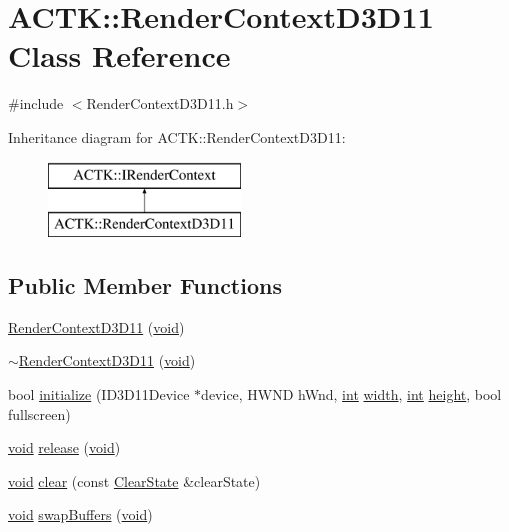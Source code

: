 \hypertarget{class_a_c_t_k_1_1_render_context_d3_d11}{\section{A\-C\-T\-K\-:\-:Render\-Context\-D3\-D11 Class Reference}
\label{class_a_c_t_k_1_1_render_context_d3_d11}
}


{\ttfamily \#include $<$Render\-Context\-D3\-D11.\-h$>$}

Inheritance diagram for A\-C\-T\-K\-:\-:Render\-Context\-D3\-D11\-:\begin{figure}[H]
\begin{center}
\leavevmode
\includegraphics[height=2.000000cm]{class_a_c_t_k_1_1_render_context_d3_d11}
\end{center}
\end{figure}
\subsection*{Public Member Functions}
\begin{DoxyCompactItemize}
\item 
\hyperlink{class_a_c_t_k_1_1_render_context_d3_d11_a189a78c7a1d4301a3fd347624e4ff572}{Render\-Context\-D3\-D11} (\hyperlink{wglew_8h_aeea6e3dfae3acf232096f57d2d57f084}{void})
\item 
\hyperlink{class_a_c_t_k_1_1_render_context_d3_d11_ac56f03dd9530502b2603d3e21151ff20}{$\sim$\-Render\-Context\-D3\-D11} (\hyperlink{wglew_8h_aeea6e3dfae3acf232096f57d2d57f084}{void})
\item 
bool \hyperlink{class_a_c_t_k_1_1_render_context_d3_d11_a57c152ac5b5315c3198c940af306d0ca}{initialize} (I\-D3\-D11\-Device $\ast$device, H\-W\-N\-D h\-Wnd, \hyperlink{wglew_8h_a500a82aecba06f4550f6849b8099ca21}{int} \hyperlink{glew_8h_aa105b18f96e6bc2485cb7f576a7fb9ba}{width}, \hyperlink{wglew_8h_a500a82aecba06f4550f6849b8099ca21}{int} \hyperlink{glew_8h_aa214bd63e12f7ddf524c83894fcc69a7}{height}, bool fullscreen)
\item 
\hyperlink{wglew_8h_aeea6e3dfae3acf232096f57d2d57f084}{void} \hyperlink{class_a_c_t_k_1_1_render_context_d3_d11_ac2f99ce57519219166f6b52ef1b4dc59}{release} (\hyperlink{wglew_8h_aeea6e3dfae3acf232096f57d2d57f084}{void})
\item 
\hyperlink{wglew_8h_aeea6e3dfae3acf232096f57d2d57f084}{void} \hyperlink{class_a_c_t_k_1_1_render_context_d3_d11_a7d5530f022d7a5280d757dbc5a262f1b}{clear} (const \hyperlink{struct_a_c_t_k_1_1_clear_state}{Clear\-State} \&clear\-State)
\item 
\hyperlink{wglew_8h_aeea6e3dfae3acf232096f57d2d57f084}{void} \hyperlink{class_a_c_t_k_1_1_render_context_d3_d11_aafb3b59411cd1e87a77d095e8de99220}{swap\-Buffers} (\hyperlink{wglew_8h_aeea6e3dfae3acf232096f57d2d57f084}{void})
\end{DoxyCompactItemize}


